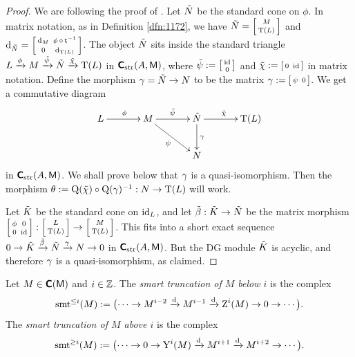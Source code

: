 \begin{proof}
We are following the proof of \cite[Proposition 1.7.5]{KaSc1}.
Let $\tilde{N}$ be the standard cone on $\phi$. In matrix notation, as 
in Definition \ref{dfn:1172}, we have
$\tilde{N} = \left[ \begin{smallmatrix} M \\[0.2em] \operatorname{T}(L) \end{smallmatrix} \right]$
and 
$\mathrm{d}_{\tilde{N}} =
\left[ \begin{smallmatrix} \mathrm{d}_M & \, \phi \, \circ \, \operatorname{t}^{-1} 
\\[0.2em] 0 & \, \mathrm{d}_{\operatorname{T}(L)} \end{smallmatrix} \right]$.
The object $\tilde{N}$ sits inside the standard triangle 
$L \xrightarrow{\phi} M \xrightarrow{\tilde{\psi}} \tilde{N} \xrightarrow{\tilde{\chi}} \operatorname{T}(L)$
in  $\boldsymbol{\mathsf{C}}_{\mathrm{str}}(A, \operatorname{\mathsf{M}})$, where 
$\tilde{\psi} := \left[ \begin{smallmatrix} \operatorname{id} \\[0.2em] 0 \end{smallmatrix} \right]$ 
and 
$\tilde{\chi} := \left[ \begin{smallmatrix} 0 & \, \operatorname{id} \end{smallmatrix} \right]$
in matrix notation. Define the morphism $\gamma = \tilde{N} \to N$ to be the matrix
$\gamma := \left[ \begin{smallmatrix} \psi & \, 0 \end{smallmatrix} \right]$. We get a commutative diagram
\[ \UseTips \xymatrix @C=8ex @R=5.5ex {
L
\ar[r]^{\phi}
&
M
\ar[r]^{\til{\psi}}
\ar[dr]_{\psi} 
&
\til{N}
\ar[r]^{\til{\chi}} 
\ar[d]^{\ga}
&
\opn{T}(L)
\\
&
&
N
} \]
in  $\boldsymbol{\mathsf{C}}_{\mathrm{str}}(A, \operatorname{\mathsf{M}})$.
We shall prove below that $\gamma$ is a quasi-isomorphism. 
Then the morphism 
$\theta := \operatorname{Q}(\tilde{\chi}) \circ \operatorname{Q}(\gamma)^{-1} : N \to \operatorname{T}(L)$ 
will work. 

Let $\tilde{K}$ be the standard cone on $\operatorname{id}_L$, and let 
$\tilde{\beta} : \tilde{K} \to \tilde{N}$ be the matrix morphism 
$\left[ \begin{smallmatrix} \phi & \, 0 \\[0.1em] 0 & \, \operatorname{id} \end{smallmatrix} \right] : 
\left[ \begin{smallmatrix} L \\[0.2em] \operatorname{T}(L) \end{smallmatrix} \right] \to
\left[ \begin{smallmatrix} M \\[0.2em] \operatorname{T}(L) \end{smallmatrix} \right]$.
This fits into a short exact sequence 
$0 \to \tilde{K} \xrightarrow{\tilde{\beta}} \tilde{N} \xrightarrow{\gamma} N \to 0$
in $\boldsymbol{\mathsf{C}}_{\mathrm{str}}(A, \operatorname{\mathsf{M}})$.
But the DG module $\tilde{K}$ is acyclic, and therefore $\gamma$ is a 
quasi-isomorphism, as claimed. 
\end{proof}

\begin{dfn} \label{dfn:2320}
Let $M \in \boldsymbol{\mathsf{C}}(\operatorname{\mathsf{M}})$ and $i \in \mathbb{Z}$. The 
{\em smart truncation of $M$ below $i$}%
%
is the complex 
\[ \operatorname{smt}^{\leq i}(M) := 
\bigl( \cdots \to M^{i-2} \xrightarrow{\mathrm{d}} M^{i-1} \xrightarrow{\mathrm{d}} \operatorname{Z}^i(M) \to 0 \to
\cdots \bigr) .  \]
The {\em smart truncation of $M$ above $i$}%
is the complex 
\[ \operatorname{smt}^{\geq i}(M) := 
\bigl( \cdots \to 0 \to \operatorname{Y}^{i}(M) \xrightarrow{\mathrm{d}} M^{i+1} \xrightarrow{\mathrm{d}} M^{i+2}
\to \cdots \bigr) . \]
\end{dfn}

